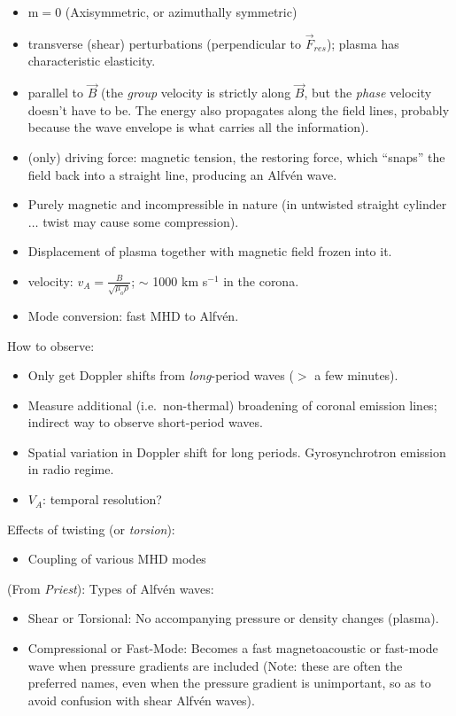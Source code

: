 \documentclass{article}
\begin{document}
\begin{itemize}
    \item m$=$0 (Axisymmetric, or azimuthally symmetric)
    \item transverse (shear) perturbations (perpendicular to $\vec{F}_{res}$);
        plasma has characteristic elasticity.
    \item parallel to $\vec{B}$ (the \emph{group} velocity  is strictly along
        ${\vec{B}}$, but the \emph{phase} velocity doesn't have to be. The
        energy also propagates along the field lines, probably because the
        wave envelope is what carries all the information).
    \item (only) driving force: magnetic tension, the restoring force,
        which ``snaps'' the field back
        into a straight line, producing an Alfv\'en wave.
    \item Purely magnetic and incompressible in nature (in untwisted straight
        cylinder$\ldots$ twist may cause some compression).
    \item Displacement of plasma together with magnetic field frozen
        into it.
    \item velocity: $v_{A} = \frac{B}{\sqrt{\mu_{o}\rho}}$;
        $\sim$ 1000 km s$^{-1}$ in the corona.
    \item Mode conversion: fast MHD to Alfv\'en.
\end{itemize}
How to observe:
\begin{itemize}
    \item Only get Doppler shifts from \emph{long}-period waves
        ($>$ a few minutes).
    \item Measure additional (i.e.\ non-thermal) broadening
        of coronal emission lines; indirect way to observe short-period waves.
    \item Spatial variation in Doppler shift for long periods.
        Gyrosynchrotron emission in radio regime.
    \item $V_{A}$: temporal resolution?
\end{itemize}
Effects of twisting (or \emph{torsion}):
\begin{itemize}
    \item Coupling of various MHD modes
\end{itemize}

(From \emph{Priest}): Types of Alfv\'en waves:
\begin{itemize}
    \item Shear or Torsional: No accompanying pressure or
        density changes (plasma).
    \item Compressional or Fast-Mode: Becomes a fast
        magnetoacoustic or fast-mode wave when pressure gradients
        are included (Note: these are often the preferred names,
        even when the pressure gradient is unimportant, so as to
        avoid confusion with shear Alfv\'en waves).
\end{itemize}
\end{document}
